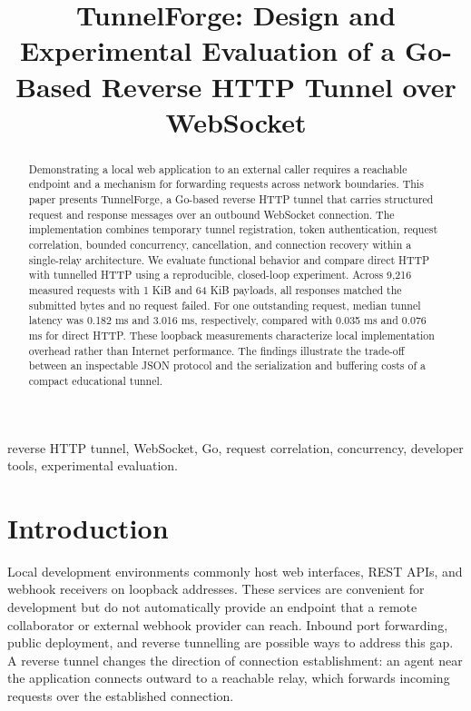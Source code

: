 \documentclass[conference]{IEEEtran}
\begin{document}
\title{TunnelForge: Design and Experimental Evaluation of a Go-Based Reverse HTTP Tunnel over WebSocket}
\author{}
\maketitle
\begin{abstract}
Demonstrating a local web application to an external caller requires a reachable endpoint and a mechanism for forwarding requests across network boundaries. This paper presents TunnelForge, a Go-based reverse HTTP tunnel that carries structured request and response messages over an outbound WebSocket connection. The implementation combines temporary tunnel registration, token authentication, request correlation, bounded concurrency, cancellation, and connection recovery within a single-relay architecture. We evaluate functional behavior and compare direct HTTP with tunnelled HTTP using a reproducible, closed-loop experiment. Across 9,216 measured requests with 1 KiB and 64 KiB payloads, all responses matched the submitted bytes and no request failed. For one outstanding request, median tunnel latency was 0.182 ms and 3.016 ms, respectively, compared with 0.035 ms and 0.076 ms for direct HTTP. These loopback measurements characterize local implementation overhead rather than Internet performance. The findings illustrate the trade-off between an inspectable JSON protocol and the serialization and buffering costs of a compact educational tunnel.
\end{abstract}

\begin{IEEEkeywords}
reverse HTTP tunnel, WebSocket, Go, request correlation, concurrency, developer tools, experimental evaluation.
\end{IEEEkeywords}

\section{Introduction}

Local development environments commonly host web interfaces, REST APIs, and webhook receivers on loopback addresses. These services are convenient for development but do not automatically provide an endpoint that a remote collaborator or external webhook provider can reach. Inbound port forwarding, public deployment, and reverse tunnelling are possible ways to address this gap. A reverse tunnel changes the direction of connection establishment: an agent near the application connects outward to a reachable relay, which forwards incoming requests over the established connection.
\end{document}
